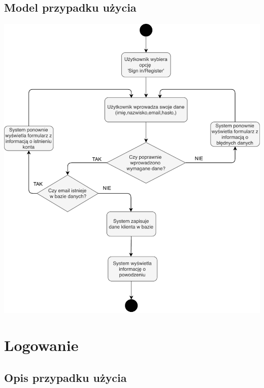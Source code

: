 \documentclass[12pt]{report}
\begin{document}
		\subsection{Model przypadku użycia}
		\begin{center}
			\includegraphics[width=400pt]{rejstracja.pdf}
		\end{center}

	
	\newpage


	
	\section{Logowanie}
	
		\subsection {Opis przypadku użycia}
	
\end{document}

